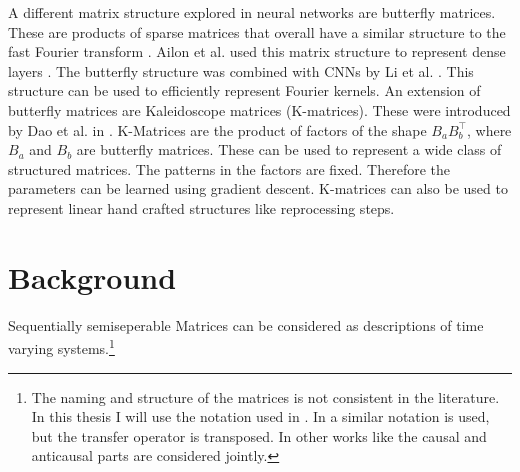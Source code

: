 \documentclass[doctype=mastersthesis,BCOR=15mm,biblatex]{ldvbook}%
\begin{document}
A different matrix structure explored in neural networks are butterfly matrices.
These are products of sparse matrices that overall have a similar structure to the fast Fourier transform \cite{li_butterfly_2015,parker_random_1995}. Ailon et al. used this matrix structure to represent dense layers \cite{ailon_sparse_2021}.
The butterfly structure was combined with CNNs by Li et al. \cite{li_butterfly-net_2020}. This structure can be used to efficiently represent Fourier kernels.
An extension of butterfly matrices are Kaleidoscope matrices (K-matrices). These were introduced by Dao et al. in \cite{dao_kaleidoscope_2020}.
K-Matrices are the product of factors of the shape $B_aB_b^\top$, where $B_a$ and $B_b$ are butterfly matrices. These can be used to represent a wide class of structured matrices.
The patterns in the factors are fixed. Therefore the parameters can be learned using gradient descent.
K-matrices can also be used to represent linear hand crafted structures like reprocessing steps. %




\chapter{Background}\label{chap:background}


Sequentially semiseperable Matrices can be considered as descriptions of time varying systems.\footnote{
The naming and structure of the matrices is not consistent in the literature.
In this thesis I will use the notation used in \cite{tong_blind_2003}. 
In \cite{dewilde_time-varying_1998} a similar notation is used, but the transfer operator is transposed.
In other works like \cite{rice_efficient_2010,chandrasekaran_fast_2002} the causal and anticausal parts are considered jointly.
}
\end{document}
